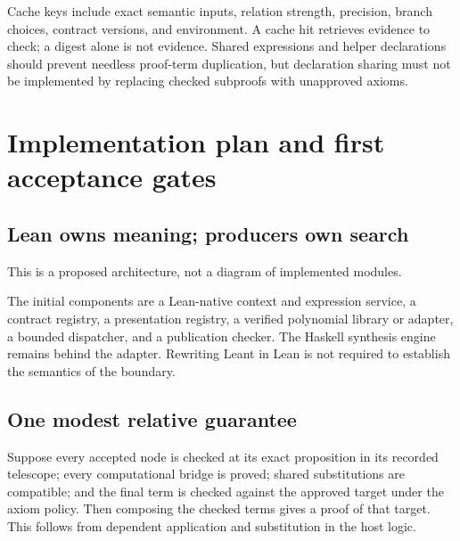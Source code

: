 \documentclass[11pt,letterpaper]{article}
\numberwithin{equation}{section}
\begin{document}
Cache keys include exact semantic inputs, relation strength, precision, branch
choices, contract versions, and environment. A cache hit retrieves evidence to
check; a digest alone is not evidence. Shared expressions and helper declarations
should prevent needless proof-term duplication, but declaration sharing must not
be implemented by replacing checked subproofs with unapproved axioms.

\section{Implementation plan and first acceptance gates}\label{sec:implementation}
\subsection{Lean owns meaning; producers own search}
\begin{center}
\end{center}
This is a proposed architecture, not a diagram of implemented modules.

The initial components are a Lean-native context and expression service, a
contract registry, a presentation registry, a verified polynomial library or
adapter, a bounded dispatcher, and a publication checker. The Haskell synthesis
engine remains behind the adapter. Rewriting Leant in Lean is not required to
establish the semantics of the boundary.

\subsection{One modest relative guarantee}
Suppose every accepted node is checked at its exact proposition in its recorded
telescope; every computational bridge is proved; shared substitutions are
compatible; and the final term is checked against the approved target under the
axiom policy. Then composing the checked terms gives a proof of that target.
This follows from dependent application and substitution in the host logic.
\end{document}
